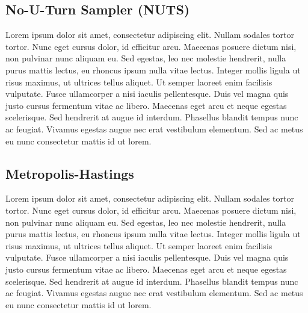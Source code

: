 \subsection{No-U-Turn Sampler (NUTS)}
Lorem ipsum dolor sit amet, consectetur adipiscing elit. Nullam sodales tortor tortor. Nunc eget cursus dolor, id efficitur arcu. Maecenas posuere dictum nisi, non pulvinar nunc aliquam eu. Sed egestas, leo nec molestie hendrerit, nulla purus mattis lectus, eu rhoncus ipsum nulla vitae lectus. Integer mollis ligula ut risus maximus, ut ultrices tellus aliquet. Ut semper laoreet enim facilisis vulputate. Fusce ullamcorper a nisi iaculis pellentesque. Duis vel magna quis justo cursus fermentum vitae ac libero. Maecenas eget arcu et neque egestas scelerisque. Sed hendrerit at augue id interdum. Phasellus blandit tempus nunc ac feugiat. Vivamus egestas augue nec erat vestibulum elementum. Sed ac metus eu nunc consectetur mattis id ut lorem.

\subsection{Metropolis-Hastings}
Lorem ipsum dolor sit amet, consectetur adipiscing elit. Nullam sodales tortor tortor. Nunc eget cursus dolor, id efficitur arcu. Maecenas posuere dictum nisi, non pulvinar nunc aliquam eu. Sed egestas, leo nec molestie hendrerit, nulla purus mattis lectus, eu rhoncus ipsum nulla vitae lectus. Integer mollis ligula ut risus maximus, ut ultrices tellus aliquet. Ut semper laoreet enim facilisis vulputate. Fusce ullamcorper a nisi iaculis pellentesque. Duis vel magna quis justo cursus fermentum vitae ac libero. Maecenas eget arcu et neque egestas scelerisque. Sed hendrerit at augue id interdum. Phasellus blandit tempus nunc ac feugiat. Vivamus egestas augue nec erat vestibulum elementum. Sed ac metus eu nunc consectetur mattis id ut lorem.